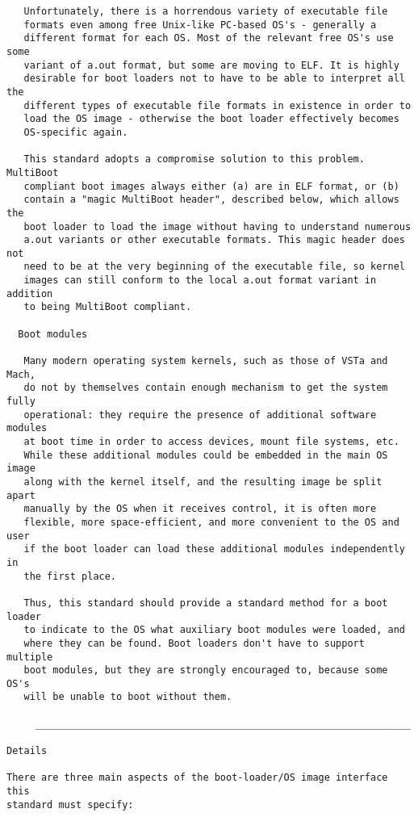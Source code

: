 \begin{verbatim}
   Unfortunately, there is a horrendous variety of executable file
   formats even among free Unix-like PC-based OS's - generally a
   different format for each OS. Most of the relevant free OS's use some
   variant of a.out format, but some are moving to ELF. It is highly
   desirable for boot loaders not to have to be able to interpret all the
   different types of executable file formats in existence in order to
   load the OS image - otherwise the boot loader effectively becomes
   OS-specific again.
   
   This standard adopts a compromise solution to this problem. MultiBoot
   compliant boot images always either (a) are in ELF format, or (b)
   contain a "magic MultiBoot header", described below, which allows the
   boot loader to load the image without having to understand numerous
   a.out variants or other executable formats. This magic header does not
   need to be at the very beginning of the executable file, so kernel
   images can still conform to the local a.out format variant in addition
   to being MultiBoot compliant.
   
  Boot modules
  
   Many modern operating system kernels, such as those of VSTa and Mach,
   do not by themselves contain enough mechanism to get the system fully
   operational: they require the presence of additional software modules
   at boot time in order to access devices, mount file systems, etc.
   While these additional modules could be embedded in the main OS image
   along with the kernel itself, and the resulting image be split apart
   manually by the OS when it receives control, it is often more
   flexible, more space-efficient, and more convenient to the OS and user
   if the boot loader can load these additional modules independently in
   the first place.
   
   Thus, this standard should provide a standard method for a boot loader
   to indicate to the OS what auxiliary boot modules were loaded, and
   where they can be found. Boot loaders don't have to support multiple
   boot modules, but they are strongly encouraged to, because some OS's
   will be unable to boot without them.
   
     _________________________________________________________________
                                      
Details

There are three main aspects of the boot-loader/OS image interface this
standard must specify:


\end{verbatim}
